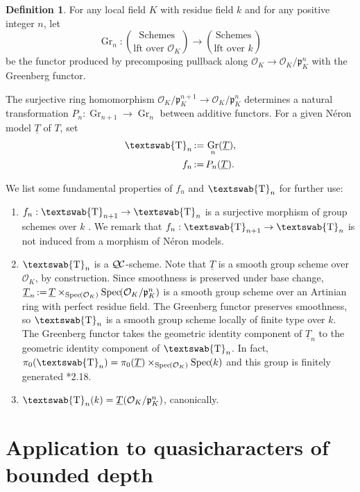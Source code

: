 \documentclass[11pt]{amsart}
\makeatletter
\newcommand{\mathswab}[1]{\operatorname{\textswab{#1}}}
\theoremstyle{plain}
\theoremstyle{definition}
\newtheorem{definition}[theorem]{Definition}
\theoremstyle{remark}
\newcommand{\Spec}[1]{{\operatorname{Spec}\hskip-1pt( #1 )}}
\newcommand{\OK}{\mathcal{O}_K}
\newcommand{\pK}{\mathfrak{p}_K}
\newcommand{\Fq}{k}
\DeclareMathOperator{\Gr}{Gr}
\newcommand{\ceq}{{\, :=\, }}
\newcommand{\GN}[1]{\mathswab{#1}}
\newcommand{\TT}{\underline{T}}
\newcommand{\QC}{{\mathcal{Q\hskip-0.8pt C}}}
\newcommand{\partop}[2]{\genfrac{(}{)}{0pt}{0}{#1}{#2}}
\newcommand{\labitem}[2]{%
\def\@itemlabel{\textbf{#1}}
\item
\def\@currentlabel{#1}\label{#2}}
\makeatother
\begin{document}
\begin{definition}\label{def:Grn}
For any local field $K$ with residue field $\Fq$ and for any positive integer $n$, let
\[
\Gr_n : \partop{\text{Schemes}}{\text{lft over $\OK$}} \to \partop{\text{Schemes}}{\text{lft over $\Fq$}}
\]
be the functor produced by precomposing pullback along $\OK \to \OK/\pK^n$ with the Greenberg functor.
\end{definition}

The surjective ring homomorphism $\OK/\pK^{n+1} \to \OK/\pK^n$ determines a
natural transformation $P_{n} : \Gr_{n+1} \to \Gr_n$ between additive functors.
For a given Néron model $\TT$ of $T$, set
\begin{align*}
 \GN{T}_n &\ceq \Gr_n(\TT), \\
 f_n &\ceq P_n(\TT).
\end{align*}

We list some fundamental properties of $f_n$ and $\GN{T}_n$ for further use:
 \begin{enumerate}
  \labitem{(GN.0)}{truncation}
  $f_n : \GN{T}_{n+1} \to \GN{T}_n$ is a surjective morphism of group schemes over $\Fq$
  .
  We remark that $f_n : \GN{T}_{n+1} \to \GN{T}_n$ is not induced from a morphism of Néron models.
  \labitem{(GN.1)}{smooth} 
  $\GN{T}_n$ is a $\QC$-scheme. 
  Note that $\underline{T}$ is a smooth group scheme over $\OK$, by construction. 
  Since smoothness is preserved under base change, 
  $\TT_n \ceq \underline{T} \times_\Spec{\OK} \Spec{\OK/\pK^n}$ 
  is a smooth group scheme over an Artinian ring with perfect residue field. 
  The Greenberg functor preserves smoothness, 
  so $\GN{T}_n$ is a smooth group scheme locally of finite type over $\Fq$. 
  The Greenberg functor takes the geometric identity component of $\TT_n$ 
  to the geometric identity component of $\GN{T}_n$.
  In fact, $\pi_0(\GN{T}_n) = \pi_0(\TT) \times_{\Spec{\OK}} \Spec{\Fq}$ and
  this group is finitely generated \cite{xarles:93a}*{2.18}.
  \labitem{(GN.2)}{points} $\GN{T}_n(\Fq) = \TT(\OK/\pK^n)$, canonically.
\end{enumerate}

\section{Application to quasicharacters of bounded depth} \label{sec:bdchar}
\end{document}
